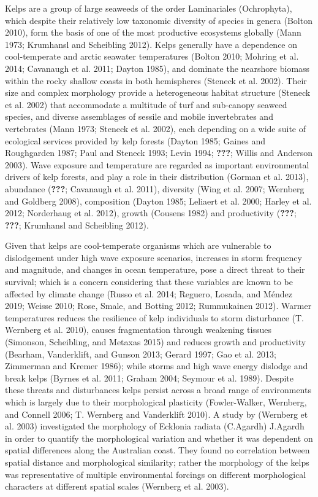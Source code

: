 \documentclass[
  a4paper,
]{article}
\begin{document}
Kelps are a group of large seaweeds of the order Laminariales
(Ochrophyta), which despite their relatively low taxonomic diversity of
species in genera (Bolton 2010), form the basis of one of the most
productive ecosystems globally (Mann 1973; Krumhansl and Scheibling
2012). Kelps generally have a dependence on cool-temperate and arctic
seawater temperatures (Bolton 2010; Mohring et al. 2014; Cavanaugh et
al. 2011; Dayton 1985), and dominate the nearshore biomass within the
rocky shallow coasts in both hemispheres (Steneck et al. 2002). Their
size and complex morphology provide a heterogeneous habitat structure
(Steneck et al. 2002) that accommodate a multitude of turf and
sub-canopy seaweed species, and diverse assemblages of sessile and
mobile invertebrates and vertebrates (Mann 1973; Steneck et al. 2002),
each depending on a wide suite of ecological services provided by kelp
forests (Dayton 1985; Gaines and Roughgarden 1987; Paul and Steneck
1993; Levin 1994; {\textbf{???}}; Willis and Anderson 2003). Wave
exposure and temperature are regarded as important environmental drivers
of kelp forests, and play a role in their distribution (Gorman et al.
2013), abundance ({\textbf{???}}; Cavanaugh et al. 2011), diversity
(Wing et al. 2007; Wernberg and Goldberg 2008), composition (Dayton
1985; Leliaert et al. 2000; Harley et al. 2012; Norderhaug et al. 2012),
growth (Cousens 1982) and productivity ({\textbf{???}}; {\textbf{???}};
Krumhansl and Scheibling 2012).

Given that kelps are cool-temperate organisms which are vulnerable to
dislodgement under high wave exposure scenarios, increases in storm
frequency and magnitude, and changes in ocean temperature, pose a direct
threat to their survival; which is a concern considering that these
variables are known to be affected by climate change (Russo et al. 2014;
Reguero, Losada, and Méndez 2019; Weisse 2010; Rose, Smale, and Botting
2012; Rummukainen 2012). Warmer temperatures reduces the resilience of
kelp individuals to storm disturbance (T. Wernberg et al. 2010), causes
fragmentation through weakening tissues (Simonson, Scheibling, and
Metaxas 2015) and reduces growth and productivity (Bearham, Vanderklift,
and Gunson 2013; Gerard 1997; Gao et al. 2013; Zimmerman and Kremer
1986); while storms and high wave energy dislodge and break kelps
(Byrnes et al. 2011; Graham 2004; Seymour et al. 1989). Despite these
threats and disturbances kelps persist across a broad range of
environments which is largely due to their morphological plasticity
(Fowler-Walker, Wernberg, and Connell 2006; T. Wernberg and Vanderklift
2010). A study by (Wernberg et al. 2003) investigated the morphology of
Ecklonia radiata (C.Agardh) J.Agardh in order to quantify the
morphological variation and whether it was dependent on spatial
differences along the Australian coast. They found no correlation
between spatial distance and morphological similarity; rather the
morphology of the kelps was representative of multiple environmental
forcings on different morphological characters at different spatial
scales (Wernberg et al. 2003).
\end{document}
